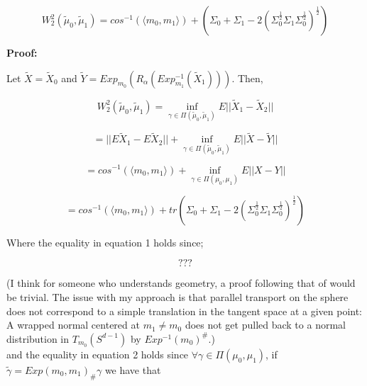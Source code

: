 \documentclass[]{article}
\begin{document}
\begin{equation*}
	W_2^2(\tilde{\mu}_0, \tilde{\mu}_1) =  cos^{-1}(\langle m_0,m_1\rangle) + (\Sigma_0 + \Sigma_1 - 2 (\Sigma_0^{\frac{1}{2}} \Sigma_1 \Sigma_0^{\frac{1}{2}})^{\frac{1}{2}}) 
\end{equation*} 

%


\textbf{Proof:}

Let $\tilde{X} = \tilde{X}_0$ and $\tilde{Y} = Exp_{m_0}(R_\alpha(Exp_{m_1}^{-1}(\tilde{X}_1)))$. Then,

\begin{equation*}
	W_2^2(\tilde{\mu}_0, \tilde{\mu}_1) =  \inf_{\gamma \in \Pi(\tilde{\mu}_0, \tilde{\mu}_1)} E||\tilde{X}_1-\tilde{X}_2||  
\end{equation*}  

\begin{equation}
	 =  ||E\tilde{X}_1 - E\tilde{X}_2|| + \inf_{\gamma \in \Pi(\tilde{\mu}_0, \tilde{\mu}_1)} E||\tilde{X} - \tilde{Y}||  
\end{equation}

\begin{equation}
	= cos^{-1}( \langle m_0, m_1 \rangle ) +\inf_{\gamma \in \Pi({\mu}_0, {\mu}_1)} E||X-Y||
\end{equation} 

\begin{equation*}
	= cos^{-1}( \langle m_0, m_1 \rangle ) + tr(\Sigma_0 + \Sigma_1 - 2(\Sigma_0^{\frac{1}{2}}\Sigma_1\Sigma_0^{\frac{1}{2}})^{\frac{1}{2}})
\end{equation*} 

Where the equality in equation 1 holds since;

\begin{equation*}
	???
\end{equation*}

(I think for someone who understands geometry, a proof following that of \cite{https://doi.org/10.48550/arxiv.0801.2250} would be trivial. The issue with my approach is that parallel transport on the sphere does not correspond to a simple translation in the tangent space at a given point: A wrapped normal centered at $m_1 \neq m_0$ does not get pulled back to a normal distribution in $T_{m_0}(S^{d-1})$ by $Exp^{-1}(m_0)^{\#}$.)\\

and the equality in equation 2 holds since $\forall \gamma \in \Pi(\mu_0, \mu_1)$, if $\tilde{\gamma} = {Exp(m_0,m_1)}_\# \gamma$ we have that 
\end{document}
